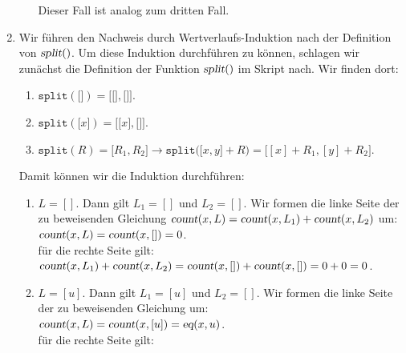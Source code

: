 \documentclass{article}
\renewcommand{\labelenumii}{\arabic{enumii}.}
\begin{document}
\begin{enumerate}
\begin{enumerate}
            Dieser Fall ist analog zum dritten Fall.
      \end{enumerate}
\item Wir f\"uhren den Nachweis durch Wertverlaufs-Induktion nach der Definition von $\textsl{split}()$.
      Um diese Induktion durchf\"uhren zu k\"onnen, schlagen wir zun\"achst die Definition der Funktion 
      $\textsl{split}()$ im Skript nach.  Wir finden dort:
      \begin{enumerate}
        \renewcommand{\labelenumii}{\arabic{enumii}.}
      \item $\mathtt{split}(\texttt{[]}) = \mathtt{[} \texttt{[]}, \texttt{[]} \mathtt{]}$.
      \item $\mathtt{split}(\mathtt{[}x\mathtt{]}) = \mathtt{[} \texttt{[}x\texttt{]}, \texttt{[]} \mathtt{]}$.
      \item $\mathtt{split}(R) = \mathtt{[}R_1, R_2\mathtt{]} \rightarrow
      \mathtt{split}\bigl(\mathtt{[}x, y\mathtt{]} + R\bigr) = \bigl[ [x] + R_1, [y] + R_2 \bigr]$.
      \end{enumerate}
      Damit k\"onnen wir die Induktion durchf\"uhren:
      \begin{enumerate}
        \renewcommand{\labelenumii}{\arabic{enumii}.}
      \item $L=[]$.  Dann gilt $L_1 = []$ und $L_2 = []$. Wir formen die linke Seite der zu beweisenden
            Gleichung $\textsl{count}(x,L) = \textsl{count}(x,L_1) + \textsl{count}(x,L_2)$ um:
            \\[0.2cm]
            \hspace*{1.3cm}
            $\textsl{count}(x,L) = \textsl{count}(x,[]) = 0$.
            \\[0.2cm]
            f\"ur die rechte Seite gilt:
            \\[0.2cm]
            \hspace*{1.3cm}
            $\textsl{count}(x,L_1) + \textsl{count}(x,L_2) = 
             \textsl{count}(x,[]) + \textsl{count}(x,[]) = 0 + 0 = 0$.
      \item $L = [u]$.  Dann gilt $L_1 = [u]$ und $L_2 = []$. Wir formen die linke Seite der zu beweisenden
            Gleichung  um:
            \\[0.2cm]
            \hspace*{1.3cm}
            $\textsl{count}(x,L) = \textsl{count}(x,[u]) = \textsl{eq}(x,u)$.
            \\[0.2cm]
            f\"ur die rechte Seite gilt:
            \begin{eqnarray*}

\end{eqnarray*}
\end{enumerate}
\end{enumerate}
\end{document}
